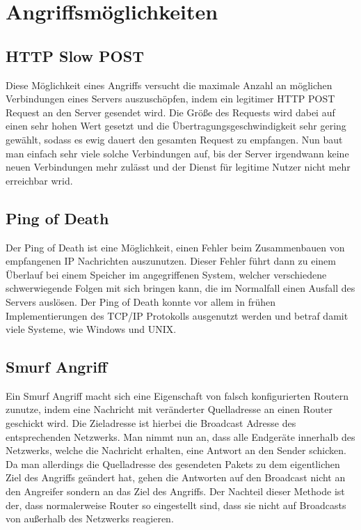 \chapter{Angriffsmöglichkeiten}
\label{chap:kapitel2}
\nocite{WikipediaDoS}

\section{HTTP Slow POST}

Diese Möglichkeit eines Angriffs versucht die maximale Anzahl an möglichen Verbindungen eines Servers auszuschöpfen, indem ein legitimer HTTP POST Request an den Server gesendet wird. Die Größe des Requests wird dabei auf einen sehr hohen Wert gesetzt und die Übertragungsgeschwindigkeit sehr gering gewählt, sodass es ewig dauert den gesamten Request zu empfangen. Nun baut man einfach sehr viele solche Verbindungen auf, bis der Server irgendwann keine neuen Verbindungen mehr zulässt und der Dienst für legitime Nutzer nicht mehr erreichbar wrid.

\section{Ping of Death}
\label{sec:k2pod}
Der Ping of Death ist eine Möglichkeit, einen Fehler beim Zusammenbauen von empfangenen IP Nachrichten auszunutzen. Dieser Fehler führt dann zu einem Überlauf bei einem Speicher im angegriffenen System, welcher verschiedene schwerwiegende Folgen mit sich bringen kann, die im Normalfall einen Ausfall des Servers auslösen. Der Ping of Death konnte vor allem in frühen Implementierungen des TCP/IP Protokolls ausgenutzt werden und betraf damit viele Systeme, wie Windows und UNIX.

\section{Smurf Angriff}

Ein Smurf Angriff macht sich eine Eigenschaft von falsch konfigurierten Routern zunutze, indem eine Nachricht mit veränderter Quelladresse an einen Router geschickt wird. Die Zieladresse ist hierbei die Broadcast Adresse des entsprechenden Netzwerks. Man nimmt nun an, dass alle Endgeräte innerhalb des Netzwerks, welche die Nachricht erhalten, eine Antwort an den Sender schicken. Da man allerdings die Quelladresse des gesendeten Pakets zu dem eigentlichen Ziel des Angriffs geändert hat, gehen die Antworten auf den Broadcast nicht an den Angreifer sondern an das Ziel des Angriffs. Der Nachteil dieser Methode ist der, dass normalerweise Router so eingestellt sind, dass sie nicht auf Broadcasts von außerhalb des Netzwerks reagieren.

